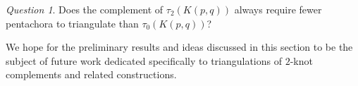 \documentclass[pdflatex,sn-mathphys-num]{sn-jnl}
\theoremstyle{thmstyleone}%
\theoremstyle{thmstyletwo}%
\theoremstyle{thmstylethree}%
\theoremstyle{remark}
\newtheorem{question}{Question}
\begin{document}
\begin{question}
	Does the complement of $\tau_2(K(p,q))$ always require fewer pentachora to triangulate than $\tau_0(K(p,q))$?
\end{question}

We hope for the preliminary results and ideas discussed in this section to be the subject of future work dedicated specifically to triangulations of $2$-knot complements and related constructions. 


{

}
\end{document}
